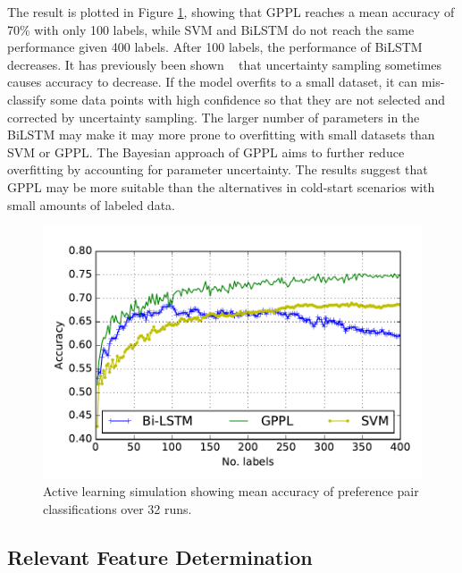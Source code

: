 The result is plotted in Figure \ref{fig:active_learning}, showing that GPPL
reaches a mean accuracy of 70\% with only 100 labels, while SVM and BiLSTM do not reach the same performance given 400 labels. 
After 100 labels, the 
performance of BiLSTM decreases. It has previously been shown ~\cite{cawley2011baseline,guyon2011results,settles2010active} that uncertainty sampling sometimes causes accuracy to decrease. If the model overfits to a small dataset, 
it can mis-classify some data points with high confidence so that they are not selected and corrected by uncertainty sampling.  
The larger number of parameters in the BiLSTM may make it may more prone to overfitting with small datasets than SVM or GPPL. 
The Bayesian approach of GPPL aims to further 
reduce overfitting by accounting for parameter uncertainty.
The results suggest that GPPL may be more suitable than the alternatives in cold-start scenarios with small amounts of labeled data. 
\begin{figure}
\centering
\includegraphics[width=0.9\columnwidth,trim=13 15 10 22.5,clip=true]{figures/active_learning_2/test_acc}
\caption{Active learning simulation showing mean accuracy of preference pair classifications over 32 runs.}
\label{fig:active_learning}
\end{figure}

\subsection{Relevant Feature Determination}

